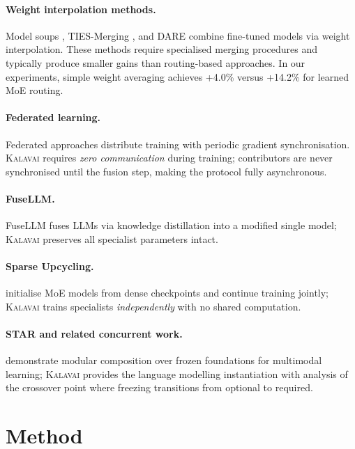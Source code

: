 \documentclass{article}
\newcommand{\kalavai}{\textsc{Kalavai}\xspace}
\begin{document}
\paragraph{Weight interpolation methods.} Model soups \citep{wortsman2022modelsoups}, TIES-Merging \citep{yadav2023tiesmerging}, and DARE \citep{yu2023dare} combine fine-tuned models via weight interpolation. These methods require specialised merging procedures and typically produce smaller gains than routing-based approaches. In our experiments, simple weight averaging achieves +4.0\% versus +14.2\% for learned MoE routing.

\paragraph{Federated learning.} Federated approaches \citep{mcmahan2017federated} distribute training with periodic gradient synchronisation. \kalavai requires \emph{zero communication} during training; contributors are never synchronised until the fusion step, making the protocol fully asynchronous.

\paragraph{FuseLLM.} FuseLLM \citep{wan2024fusellm} fuses LLMs via knowledge distillation into a modified single model; \kalavai preserves all specialist parameters intact.

\paragraph{Sparse Upcycling.} \citet{komatsuzaki2023sparseupcycling} initialise MoE models from dense checkpoints and continue training jointly; \kalavai trains specialists \emph{independently} with no shared computation.

\paragraph{STAR and related concurrent work.} \citet{qin2025star} demonstrate modular composition over frozen foundations for multimodal learning; \kalavai provides the language modelling instantiation with analysis of the crossover point where freezing transitions from optional to required.

\section{Method}
\label{sec:method}
\end{document}
